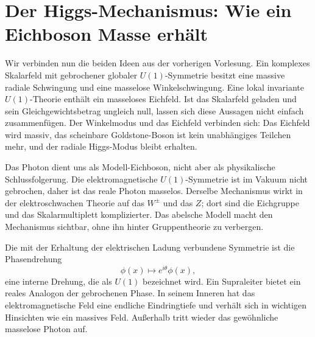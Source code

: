 \chapter{Der Higgs-Mechanismus: Wie ein Eichboson Masse erhält}

Wir verbinden nun die beiden Ideen aus der vorherigen Vorlesung. Ein komplexes Skalarfeld mit gebrochener globaler \(U(1)\)-Symmetrie besitzt eine massive radiale Schwingung und eine masselose Winkelschwingung. Eine lokal invariante \(U(1)\)-Theorie enthält ein masseloses Eichfeld. Ist das Skalarfeld geladen und sein Gleichgewichtsbetrag ungleich null, lassen sich diese Aussagen nicht einfach zusammenfügen. Der Winkelmodus und das Eichfeld verbinden sich: Das Eichfeld wird massiv, das scheinbare Goldstone-Boson ist kein unabhängiges Teilchen mehr, und der radiale Higgs-Modus bleibt erhalten.

Das Photon dient uns als Modell-Eichboson, nicht aber als physikalische Schlussfolgerung. Die elektromagnetische \(U(1)\)-Symmetrie ist im Vakuum nicht gebrochen, daher ist das reale Photon masselos. Derselbe Mechanismus wirkt in der elektroschwachen Theorie auf das \(W^\pm\) und das \(Z\); dort sind die Eichgruppe und das Skalarmultiplett komplizierter. Das abelsche Modell macht den Mechanismus sichtbar, ohne ihn hinter Gruppentheorie zu verbergen.

\begin{classroomqa}
\end{classroomqa}

Die mit der Erhaltung der elektrischen Ladung verbundene Symmetrie ist die Phasendrehung
\begin{equation}
  \phi(x)\longmapsto e^{i\theta}\phi(x),
\end{equation}
eine interne Drehung, die als \(U(1)\) bezeichnet wird. Ein Supraleiter bietet ein reales Analogon der gebrochenen Phase. In seinem Inneren hat das elektromagnetische Feld eine endliche Eindringtiefe und verhält sich in wichtigen Hinsichten wie ein massives Feld. Außerhalb tritt wieder das gewöhnliche masselose Photon auf.


